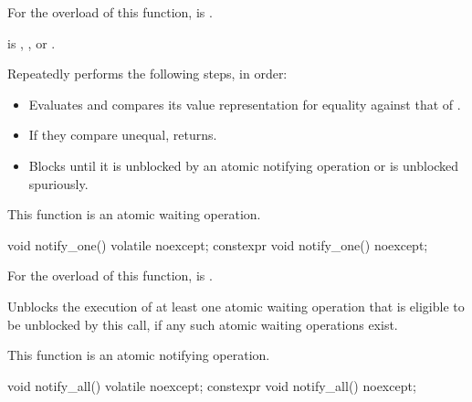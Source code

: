 \begin{itemdescr}
\pnum
\constraints
For the  overload of this function,
 is .

\pnum
\expects
{} is
,
, or
.

\pnum
\effects
Repeatedly performs the following steps, in order:
\begin{itemize}
\item
  Evaluates  and
  compares its value representation for equality against that of .
\item
  If they compare unequal, returns.
\item
  Blocks until it
  is unblocked by an atomic notifying operation or is unblocked spuriously.
\end{itemize}

\pnum
\remarks
This function is an atomic waiting operation.
\end{itemdescr}

%
%
%
%
%
%
\begin{itemdecl}
void notify_one() volatile noexcept;
constexpr void notify_one() noexcept;
\end{itemdecl}

\begin{itemdescr}
\pnum
\constraints
For the  overload of this function,
 is .

\pnum
\effects
Unblocks the execution of at least one atomic waiting operation
that is eligible to be unblocked by this call,
if any such atomic waiting operations exist.

\pnum
\remarks
This function is an atomic notifying operation.
\end{itemdescr}

%
%
%
%
%
%
\begin{itemdecl}
void notify_all() volatile noexcept;
constexpr void notify_all() noexcept;
\end{itemdecl}

